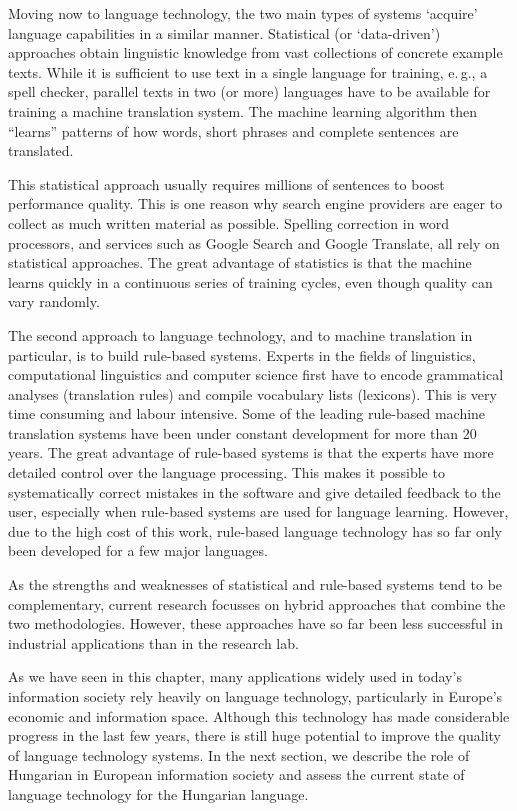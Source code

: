 \begin{multicols}{2}
  Moving now to language technology, the two main types of systems `acquire' language capabilities in a similar manner. Statistical (or ‘data-driven’) approaches obtain linguistic knowledge from vast collections of concrete example texts. While it is sufficient to use text in a single language for training, e.\,g., a spell checker, parallel texts in two (or more) languages have to be available for training a machine translation system. The machine learning algorithm then “learns” patterns of how words, short phrases and complete sentences are translated. 

  This statistical approach usually requires millions of sentences to boost performance quality. This is one reason why search engine providers are eager to collect as much written material as possible. Spelling correction in word processors, and services such as Google Search and Google Translate, all rely on statistical approaches. The great advantage of statistics is that the machine learns quickly in a continuous series of training cycles, even though quality can vary randomly.

  The second approach to language technology, and to machine translation in particular, is to build rule-based systems. Experts in the fields of linguistics, computational linguistics and computer science first have to encode grammatical analyses (translation rules) and compile vocabulary lists (lexicons). This is very time consuming and labour intensive. Some of the leading rule-based machine translation systems have been under constant development for more than 20 years. The great advantage of rule-based systems is that the experts have more detailed control over the language processing. This makes it possible to systematically correct mistakes in the software and give detailed feedback to the user, especially when rule-based systems are used for language learning. However, due to the high cost of this work, rule-based language technology has so far only been developed for a few major languages.

  As the strengths and weaknesses of statistical and rule-based systems tend to be complementary, current research focusses on hybrid approaches that combine the two methodologies. However, these approaches have so far been less successful in industrial applications than in the research lab. 

  As we have seen in this chapter, many applications widely used in today’s information society rely heavily on language technology, particularly in Europe’s economic and information space. Although this technology has made considerable progress in the last few years, there is still huge potential to improve the quality of language technology systems. In the next section, we describe the role of Hungarian in European information society and assess the current state of language technology for the Hungarian language.
  \end{multicols}

